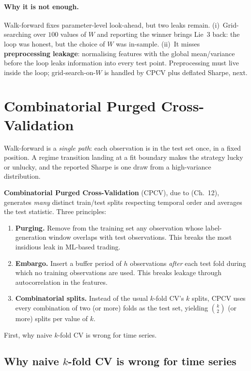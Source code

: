 \paragraph{Why it is not enough.} Walk-forward fixes parameter-level
look-ahead, but two leaks remain. (i)~Grid-searching over $100$
values of $W$ and reporting the winner brings Lie~3 back: the
loop was honest, but the choice of $W$ was in-sample. (ii)~It
misses \textbf{preprocessing leakage}: normalising features with
the global mean/variance before the loop leaks information into
every test point. Preprocessing must live inside the loop;
grid-search-on-$W$ is handled by CPCV plus deflated Sharpe, next.

\section{Combinatorial Purged Cross-Validation}
\label{sec:bt_cpcv}

Walk-forward is a \emph{single path}: each observation is in the
test set once, in a fixed position. A regime transition landing at
a fit boundary makes the strategy lucky or unlucky, and the reported
Sharpe is one draw from a high-variance distribution.

\textbf{Combinatorial Purged Cross-Validation} (CPCV), due to
\citet{lopezdeprado2018afml} (Ch.~12), generates \emph{many} distinct
train/test splits respecting temporal order and averages the test
statistic. Three principles:
\begin{enumerate}
  \item \textbf{Purging.} Remove from the training set any
  observation whose label-generation window overlaps with test
  observations. This breaks the most insidious leak in ML-based
  trading.
  \item \textbf{Embargo.} Insert a buffer period of $h$
  observations \emph{after} each test fold during which no
  training observations are used. This breaks leakage through
  autocorrelation in the features.
  \item \textbf{Combinatorial splits.} Instead of the usual
  $k$-fold CV's $k$ splits, CPCV uses every combination of two
  (or more) folds as the test set, yielding $\binom{k}{2}$ (or
  more) splits per value of $k$.
\end{enumerate}
First, why naive $k$-fold CV is wrong for time series.

\subsection{Why naive $k$-fold CV is wrong for time series}
\label{subsec:bt_why_kfold_wrong}

